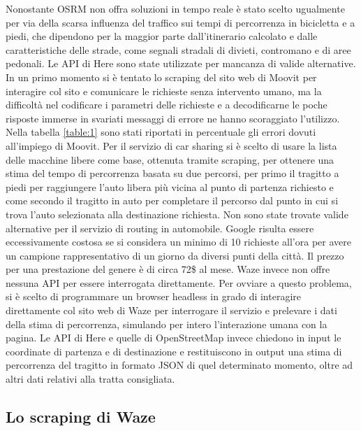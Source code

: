 Nonostante OSRM non offra soluzioni in tempo reale è stato scelto ugualmente per via della scarsa influenza del traffico sui tempi di percorrenza in bicicletta e a piedi, che dipendono per la maggior parte dall'itinerario calcolato e dalle caratteristiche delle strade, come segnali stradali di divieti, contromano e di aree pedonali. Le API di Here sono state utilizzate per mancanza di valide alternative. In un primo momento si è tentato lo scraping del sito web di Moovit per interagire col sito e comunicare le richieste senza intervento umano, ma la difficoltà nel codificare i parametri delle richieste e a decodificarne le poche risposte immerse in svariati messaggi di errore ne hanno scoraggiato l'utilizzo. Nella tabella \ref{table:1} sono stati riportati in percentuale gli errori dovuti all'impiego di Moovit. Per il servizio di car sharing si è scelto di usare la lista delle macchine libere come base, ottenuta tramite scraping, per ottenere una stima del tempo di percorrenza basata su due percorsi, per primo il tragitto a piedi per raggiungere l'auto libera più vicina al punto di partenza richiesto e come secondo il tragitto in auto per completare il percorso dal punto in cui si trova l'auto selezionata alla destinazione richiesta. Non sono state trovate valide alternative per il servizio di routing in automobile. Google risulta essere eccessivamente costosa se si considera un minimo di 10 richieste all'ora per avere un campione rappresentativo di un giorno da diversi punti della città. Il prezzo per una prestazione del genere è di circa 72\$ al mese. Waze invece non offre nessuna API per essere interrogata direttamente. Per ovviare a questo problema, si è scelto di programmare un browser headless in grado di interagire direttamente col sito web di Waze per interrogare il servizio e prelevare i dati della stima di percorrenza, simulando per intero l'interazione umana con la pagina. Le API di Here e quelle di OpenStreetMap invece chiedono in input le coordinate di partenza e di destinazione e restituiscono in output una stima di percorrenza del tragitto in formato JSON di quel determinato momento, oltre ad altri dati relativi alla tratta consigliata.

\subsection{Lo scraping di Waze}

